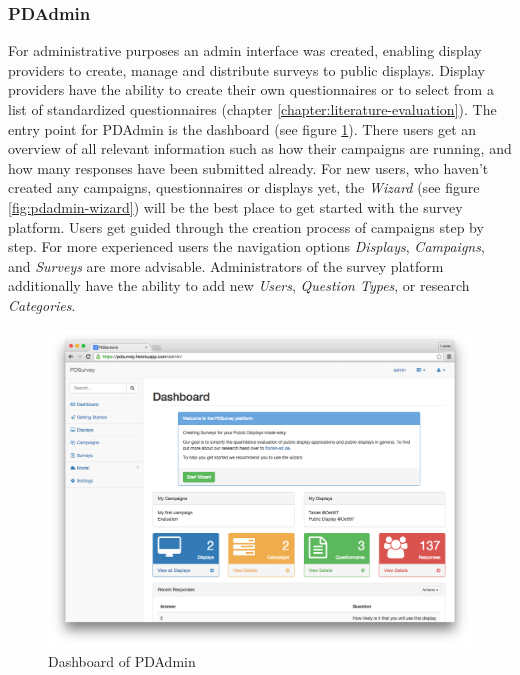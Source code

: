 	\subsubsection{PDAdmin}

		For administrative purposes an admin interface was created, enabling display providers to create, manage and distribute surveys to public displays. Display providers have the ability to create their own questionnaires or to select from a list of standardized questionnaires (chapter \ref{chapter:literature-evaluation}).
		The entry point for PDAdmin is the dashboard (see figure \ref{fig:pdadmin-dashobard}). There users get an overview of all relevant information such as how their campaigns are running, and how many responses have been submitted already. 
		For new users, who haven't created any campaigns, questionnaires or displays yet, the \textit{Wizard} (see figure \ref{fig:pdadmin-wizard}) will be the best place to get started with the survey platform. Users get guided through the creation process of campaigns step by step.
		For more experienced users the navigation options \textit{Displays}, \textit{Campaigns}, and \textit{Surveys} are more advisable. 
		Administrators of the survey platform additionally have the ability to add new \textit{Users}, \textit{Question Types}, or research \textit{Categories}.


	\begin{figure}%
	    \begin{center}
	        \includegraphics[width=.8\columnwidth]{img/screenshots/pdadmin/dashboard.png}
	    \end{center}
	 \caption[PDAdmin Dashboard]{Dashboard of PDAdmin}
	 \label{fig:pdadmin-dashobard}
	\end{figure}

